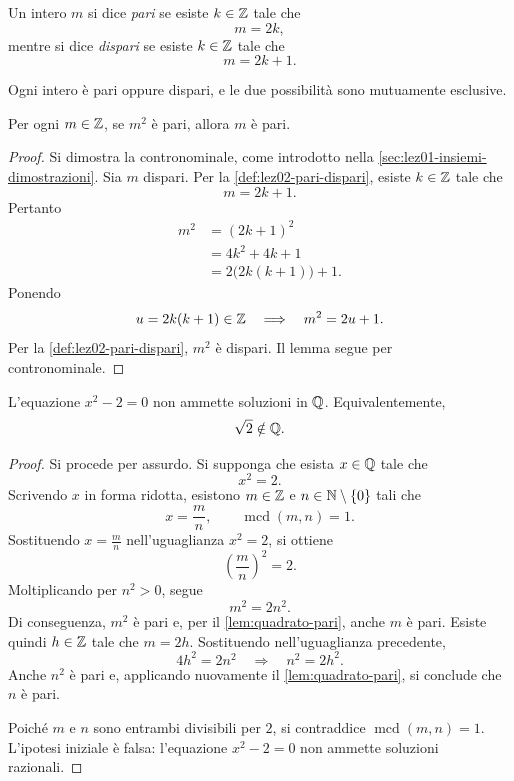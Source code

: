 \begin{definition}
\label{def:lez02-pari-dispari}
Un intero \(m\) si dice \emph{pari} se esiste \(k\in\mathbb{Z}\) tale che
\[
  m=2k,
\]
mentre si dice \emph{dispari} se esiste \(k\in\mathbb{Z}\) tale che
\[
  m=2k+1.
\]
\end{definition}

Ogni intero è pari oppure dispari, e le due possibilità sono
mutuamente esclusive.

\clearpage

\begin{lemma}
\label{lem:quadrato-pari}
Per ogni \(m\in\mathbb{Z}\), se \(m^2\) è pari, allora \(m\) è pari.
\end{lemma}

\begin{proof}
Si dimostra la contronominale, come introdotto nella
\cref{sec:lez01-insiemi-dimostrazioni}. Sia \(m\) dispari. Per la
\cref{def:lez02-pari-dispari}, esiste \(k\in\mathbb{Z}\) tale che
\[
  m=2k+1.
\]
Pertanto
\begin{align*}
  m^2
    &=(2k+1)^2\\
    &=4k^2+4k+1\\
    &=2\bigl(2k(k+1)\bigr)+1.
\end{align*}
Ponendo
\[
  u=2k(k+1)\in\mathbb{Z}
  \quad\Longrightarrow\quad
  m^2=2u+1.
\]
Per la \cref{def:lez02-pari-dispari}, \(m^2\) è dispari.
Il lemma segue per contronominale.
\end{proof}

\begin{theorem}
\label{thm:irrazionalita-radice-due}
L'equazione \(x^2-2=0\) non ammette soluzioni in \(\mathbb{Q}\).
Equivalentemente,
\[
  \sqrt{2}\notin\mathbb{Q}.
\]
\end{theorem}

\begin{proof}
Si procede per assurdo. Si supponga che esista \(x\in\mathbb{Q}\) tale che
\[
  x^2=2.
\]
Scrivendo \(x\) in forma ridotta, esistono \(m\in\mathbb{Z}\) e
\(n\in\mathbb{N}\setminus\{0\}\) tali che
\[
  x=\frac{m}{n},
  \qquad
  \operatorname{mcd}(m,n)=1.
\]
Sostituendo \(x=\frac{m}{n}\) nell'uguaglianza
\(x^2=2\), si ottiene
\[
  \left(\frac{m}{n}\right)^2=2.
\]
Moltiplicando per \(n^2>0\), segue
\[
  m^2=2n^2.
\]
Di conseguenza, \(m^2\) è pari e, per il \cref{lem:quadrato-pari},
anche \(m\) è pari. Esiste quindi \(h\in\mathbb{Z}\) tale che \(m=2h\).
Sostituendo nell'uguaglianza precedente,
\[
  4h^2=2n^2
  \quad\Longrightarrow\quad
  n^2=2h^2.
\]
Anche \(n^2\) è pari e, applicando nuovamente il
\cref{lem:quadrato-pari}, si conclude che \(n\) è pari.

Poiché \(m\) e \(n\) sono entrambi divisibili per \(2\),
si contraddice \(\operatorname{mcd}(m,n)=1\).
L'ipotesi iniziale è falsa: l'equazione \(x^2-2=0\) non ammette
soluzioni razionali.
\end{proof}

